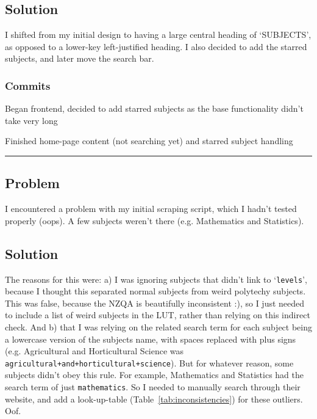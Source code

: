 \documentclass{article}
\begin{document}
\subsection*{Solution}
I shifted from my initial design to having a large central heading of `SUBJECTS', as opposed to a lower-key left-justified heading. I also decided to add the starred subjects, and later move the search bar.

\subsubsection*{Commits}
\begin{description}\small
    \item[\texttt{602908d}] Began frontend, decided to add starred subjects as the base functionality didn't take very long
    \item[\texttt{33bffc8}] Finished home-page content (not searching yet) and starred subject handling
\end{description}
\normalfont

\begin{center}
\rule{0.5\textwidth}{0.2pt}
\end{center}

\subsection*{Problem}
I encountered a problem with my initial scraping script, which I hadn't tested properly (oops). A few subjects weren't there (e.g. Mathematics and Statistics).
\subsection*{Solution}
The reasons for this were: a) I was ignoring subjects that didn't link to `\texttt{levels}', because I thought this separated normal subjects from weird polytechy subjects. This was false, because the NZQA is beautifully inconsistent :), so I just needed to include a list of weird subjects in the LUT, rather than relying on this indirect check. And b) that I was relying on the related search term for each subject being a lowercase version of the subjects name, with spaces replaced with plus signs (e.g. Agricultural and Horticultural Science was \texttt{agricultural+and+horticultural+science}). But for whatever reason, some subjects didn't obey this rule. For example, Mathematics and Statistics had the search term of just \texttt{mathematics}. So I needed to manually search through their website, and add a look-up-table (Table~\ref{tab:inconsistencies}) for these outliers. Oof.
\end{document}
